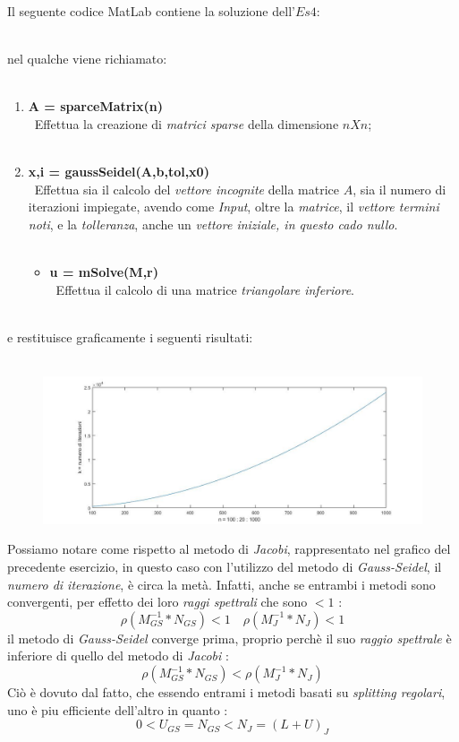 Il seguente codice MatLab contiene la soluzione dell'$Es 4$:\\\
	
nel qualche viene richiamato:\\\
	\begin{enumerate}
		\item \textbf{A = sparceMatrix(n)}\\\
			Effettua la creazione di \textit{matrici sparse} della dimensione $nXn$;\\\
		\item \textbf{x,i = gaussSeidel(A,b,tol,x0)}\\\
			Effettua sia il calcolo del \textit{vettore incognite} della matrice $A$, sia il numero di iterazioni impiegate, avendo come \textit{Input}, oltre la 	\textit{matrice}, il \textit{vettore termini noti}, e la \textit{tolleranza}, anche un \textit{vettore iniziale, in questo cado nullo}.\\\
			
			\begin{itemize}
				\item \textbf{u = mSolve(M,r)}\\\
					Effettua il calcolo di una matrice \textit{triangolare inferiore}.\\\
					
			\end{itemize}
	\end{enumerate}
e restituisce graficamente i seguenti risultati:\\\
	\begin{figure}[H]
		\includegraphics[width=\textwidth]{Plot/Cap_6_Es_4}
	\end{figure}
Possiamo notare come rispetto al metodo di \textit{Jacobi}, rappresentato nel grafico del precedente esercizio, in questo caso con l'utilizzo del metodo di \textit{Gauss-Seidel}, il \textit{numero di iterazione}, è circa la metà. Infatti, anche se entrambi i metodi sono convergenti, per effetto dei loro \textit{raggi spettrali} che sono $<1$ :
	\[
		\rho(M^{-1}_{GS}*N_{GS})<1 \quad \rho(M^{-1}_{J}*N_{J})<1
	\]
il metodo di \textit{Gauss-Seidel} converge prima, proprio perchè il suo \textit{raggio spettrale} è inferiore di quello del metodo di \textit{Jacobi} :
	\[
		\rho(M^{-1}_{GS}*N_{GS})<\rho(M^{-1}_{J}*N_{J})
	\]
Ciò è dovuto dal fatto, che essendo entrami i metodi basati su \textit{splitting regolari}, uno è piu efficiente dell'altro in quanto :
	\[
		0<U_{GS}=N_{GS}<N_{J}=(L+U)_{J}
	\]
